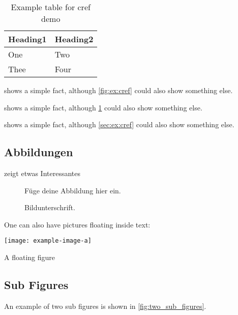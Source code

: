 \documentclass[runningheads,a4paper,ngerman]{llncs}[2022/01/12]
\begin{document}
\begin{table}
    \centering
    \begin{tabular}{ll}
      \toprule
      Heading1 & Heading2 \\
      \midrule
      One      & Two      \\
      Thee     & Four     \\
      \bottomrule
    \end{tabular}
    \caption{Example table for cref demo}
    \label{tab:ex:cref}
\end{table}

\begin{ltgexample}
 shows a simple fact, although \cref{fig:ex:cref} could also show something else.

 shows a simple fact, although \cref{tab:ex:cref} could also show something else.

 shows a simple fact, although \cref{sec:ex:cref} could also show something else.
\end{ltgexample}

\subsection{Abbildungen}

\begin{ltgexample}
 zeigt etwas Interessantes

\begin{figure}
  \centering
  Füge deine Abbildung hier ein.
  \caption{Bildunterschrift.}
  \label{fig:label}
\end{figure}
\end{ltgexample}

One can also have pictures floating inside text:
\clearpage

\begin{ltgexample}
\begin{floatingfigure}{.33\linewidth}
\texttt{[image: example-image-a]}
\caption{A floating figure}
\end{floatingfigure}
\lipsum[2]
\end{ltgexample}

\subsection{Sub Figures}

An example of two sub figures is shown in \cref{fig:two_sub_figures}.
\end{document}
